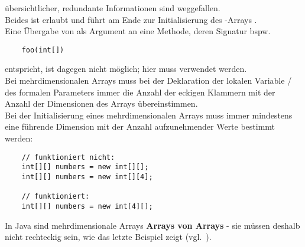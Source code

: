 übersichtlicher, redundante Informationen sind weggefallen.\\
Beides ist erlaubt und führt am Ende zur Initialisierung des -Arrays \code{[1, 2, 3, 4]}.\\
Eine Übergabe von  als Argument an eine Methode, deren Signatur bspw.


\begin{verbatim}
    foo(int[])
\end{verbatim}

entspricht, ist dagegen nicht möglich; hier muss  verwendet werden.\\

\noindent
Bei mehrdimensionalen Arrays muss bei der Deklaration der lokalen Variable / des formalen Parameters immer die Anzahl der eckigen Klammern \code{[]} mit der Anzahl der Dimensionen des Arrays übereinstimmen.\\
Bei der Initialisierung eines mehrdimensionalen Arrays muss immer mindestens eine führende Dimension mit der Anzahl aufzunehmender Werte bestimmt werden:

\begin{verbatim}
    // funktioniert nicht:
    int[][] numbers = new int[][];
    int[][] numbers = new int[][4];

    // funktioniert:
    int[][] numbers = new int[4][];
\end{verbatim}

In Java sind mehrdimensionale Arrays \textbf{Arrays von Arrays} - sie müssen deshalb nicht rechteckig sein, wie das letzte Beispiel zeigt (vgl.~\cite[273 ff.]{Ull23}).
